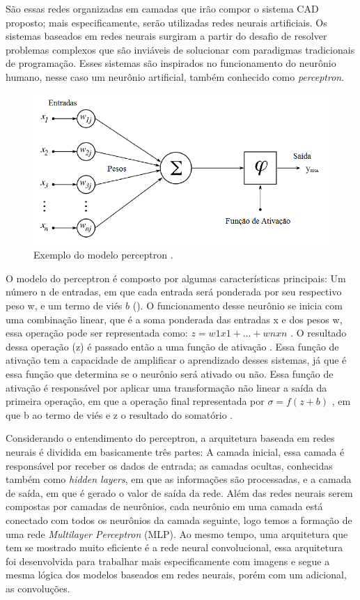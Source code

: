 São essas redes organizadas em camadas que irão compor o sistema CAD proposto; mais especificamente, serão utilizadas redes neurais artificiais. Os sistemas baseados em redes neurais surgiram a partir do desafio de resolver problemas complexos que são inviáveis de solucionar com paradigmas tradicionais de programação. Esses sistemas são inspirados no funcionamento do neurônio humano, nesse caso um neurônio artificial, também conhecido como \textit{perceptron}.

\begin{figure}[h]
\centering\includegraphics[scale=0.4]{images/Figura-1-neuronio-artificial.png}
\caption{Exemplo do modelo perceptron \cite{imagemperceptron}.}
\label{fig: perceptron}
\end{figure}

O modelo do perceptron é composto por algumas características principais: Um número n de entradas, em que cada entrada será ponderada por seu respectivo peso w, e um termo de viés \(b\) (). O funcionamento desse neurônio se inicia com uma combinação linear, que é a soma ponderada das entradas x e dos pesos w, essa operação pode ser representada como: \(z = w1  x1 + ... + wn  xn\)  . O resultado dessa operação (z) é passado então a uma função de ativação . Essa função de ativação tem a capacidade de amplificar o aprendizado desses sistemas, já que é essa função que determina se o neurônio será ativado ou não. Essa função de ativação é responsável por aplicar uma transformação não linear a saída da primeira operação, em que a operação final representada por \(  \sigma  = f(z + b)\) , em que b ao termo de viés e z o resultado do somatório \cite{haykin2009neural}. 


Considerando o entendimento do perceptron, a arquitetura baseada em redes neurais é dividida em basicamente três partes: A camada inicial, essa camada é responsável por receber os dados de entrada; as camadas ocultas, conhecidas também como \textit{hidden layers}, em que as informações são processadas, e a camada de saída, em que é gerado o valor de saída da rede. Além das redes neurais serem compostas por camadas de neurônios, cada neurônio em uma camada está conectado com todos os neurônios da camada seguinte, logo temos a formação de uma rede \textit{Multilayer Perceptron} (MLP). Ao mesmo tempo, uma arquitetura que tem se mostrado muito eficiente é a rede neural convolucional, essa arquitetura foi desenvolvida para trabalhar mais especificamente com imagens e segue a mesma lógica dos modelos baseados em redes neurais, porém com um adicional, as convoluções. 


